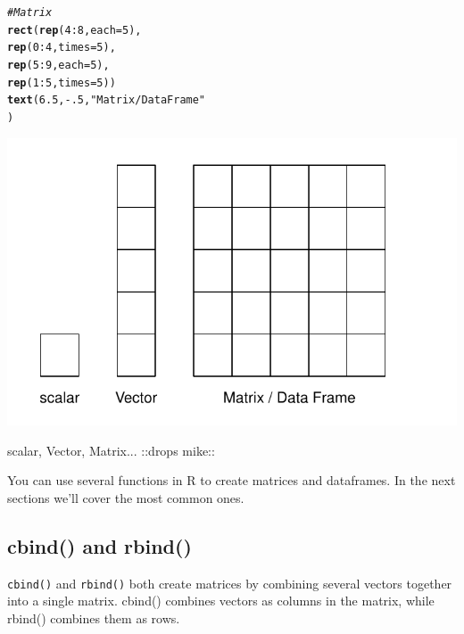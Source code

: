 \documentclass{tufte-book}\usepackage[]{graphicx}\usepackage[]{color}
\makeatletter
\def\maxwidth{ %
  \ifdim\Gin@nat@width>\linewidth
    \linewidth
  \else
    \Gin@nat@width
  \fi
}
\newcommand{\hlnum}[1]{\textcolor[rgb]{0.686,0.059,0.569}{#1}}%
\newcommand{\hlstr}[1]{\textcolor[rgb]{0.192,0.494,0.8}{#1}}%
\newcommand{\hlcom}[1]{\textcolor[rgb]{0.678,0.584,0.686}{\textit{#1}}}%
\newcommand{\hlopt}[1]{\textcolor[rgb]{0,0,0}{#1}}%
\newcommand{\hlstd}[1]{\textcolor[rgb]{0.345,0.345,0.345}{#1}}%
\newcommand{\hlkwc}[1]{\textcolor[rgb]{0.333,0.667,0.333}{#1}}%
\newcommand{\hlkwd}[1]{\textcolor[rgb]{0.737,0.353,0.396}{\textbf{#1}}}%
\newenvironment{kframe}{%
 \def\at@end@of@kframe{}%
 \ifinner\ifhmode%
  \def\at@end@of@kframe{\end{minipage}}%
  \begin{minipage}{\columnwidth}%
 \fi\fi%
 \def\FrameCommand##1{\hskip\@totalleftmargin \hskip-\fboxsep
 \colorbox{shadecolor}{##1}\hskip-\fboxsep
     \hskip-\linewidth \hskip-\@totalleftmargin \hskip\columnwidth}%
 \MakeFramed {\advance\hsize-\width
   \@totalleftmargin\z@ \linewidth\hsize
   \@setminipage}}%
 {\par\unskip\endMakeFramed%
 \at@end@of@kframe}
\newenvironment{knitrout}{}{} %
\makeatother
\begin{document}
\begin{marginfigure}
\begin{tiny}
\begin{knitrout}
\begin{kframe}
\begin{alltt}
\hlcom{# Matrix}
\hlkwd{rect}\hlstd{(}\hlkwd{rep}\hlstd{(}\hlnum{4}\hlopt{:}\hlnum{8}\hlstd{,} \hlkwc{each} \hlstd{=} \hlnum{5}\hlstd{),}
     \hlkwd{rep}\hlstd{(}\hlnum{0}\hlopt{:}\hlnum{4}\hlstd{,} \hlkwc{times} \hlstd{=} \hlnum{5}\hlstd{),}
     \hlkwd{rep}\hlstd{(}\hlnum{5}\hlopt{:}\hlnum{9}\hlstd{,} \hlkwc{each} \hlstd{=} \hlnum{5}\hlstd{),}
     \hlkwd{rep}\hlstd{(}\hlnum{1}\hlopt{:}\hlnum{5}\hlstd{,} \hlkwc{times} \hlstd{=} \hlnum{5}\hlstd{))}
\hlkwd{text}\hlstd{(}\hlnum{6.5}\hlstd{,} \hlopt{-}\hlnum{.5}\hlstd{,} \hlstr{"Matrix / Data Frame"}
     \hlstd{)}
\end{alltt}
\end{kframe}
\includegraphics[width=\maxwidth]{figure/unnamed-chunk-116-1} 

\end{knitrout}
\caption{scalar, Vector, Matrix... ::drops mike::}
\label{fig:scalarvectormatrix}
\end{tiny}
\end{marginfigure}

You can use several functions in R to create matrices and dataframes. In the next sections we'll cover the most common ones.

\subsection{cbind() and rbind()}

\texttt{cbind()} and \texttt{rbind()} both create matrices by combining several vectors together into a single matrix. cbind() combines vectors as columns in the matrix, while rbind() combines them as rows.
\end{document}
